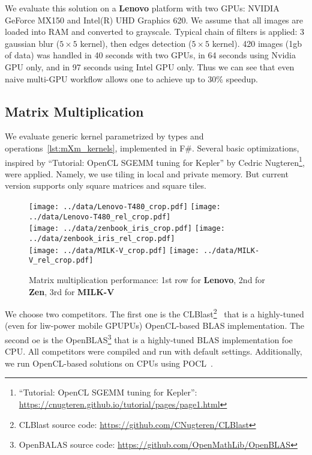 We evaluate this solution on a \textbf{Lenovo} platform with two GPUs: NVIDIA GeForce MX150 and Intel(R) UHD Graphics 620.
We assume that all images are loaded into RAM and converted to grayscale. 
Typical chain of filters is applied: 3 gaussian blur ($5 \times 5$ kernel), then edges detection ($5 \times 5$ kernel).
420 images (1gb of data) was handled in 40 seconds with two GPUs, in 64 seconds using Nvidia GPU only, and in 97 seconds using Intel GPU only.
Thus we can see that even naive multi-GPU workflow allows one to achieve up to 30\% speedup.

\subsection{Matrix Multiplication}

We evaluate generic kernel parametrized by types and operations~\ref{lst:mXm_kernels}, implemented in F\#.
Several basic optimizations, inspired by ``Tutorial: OpenCL SGEMM tuning for Kepler'' by Cedric Nugteren\footnote{``Tutorial: OpenCL SGEMM tuning for Kepler'': \url{https://cnugteren.github.io/tutorial/pages/page1.html}}, were applied.
Namely, we use tiling in local and private memory.
But current version supports only square matrices and square tiles.

\begin{figure}
  \begin{center}
  \texttt{[image: ../data/Lenovo-T480\_crop.pdf]}
  \texttt{[image: ../data/Lenovo-T480\_rel\_crop.pdf]}\\
  \texttt{[image: ../data/zenbook\_iris\_crop.pdf]}
  \texttt{[image: ../data/zenbook\_iris\_rel\_crop.pdf]}\\
  \texttt{[image: ../data/MILK-V\_crop.pdf]}
  \texttt{[image: ../data/MILK-V\_rel\_crop.pdf]}
  \end{center}
  \caption{Matrix multiplication performance: 1st row for \textbf{Lenovo}, 2nd for \textbf{Zen}, 3rd for \textbf{MILK-V}}
  \label{fig:mxm_perf}
\end{figure}

We choose two competitors.
The first one is the CLBlast\footnote{CLBlast source code: \url{https://github.com/CNugteren/CLBlast}}~\cite{10.1145/3204919.3204924} that is a highly-tuned (even for liw-power mobile GPUPUs) OpenCL-based BLAS implementation.
The second oe is the OpenBLAS\footnote{OpenBALAS source code: \url{https://github.com/OpenMathLib/OpenBLAS}} that is a highly-tuned BLAS implementation foe CPU.
All competitors were compiled and run with default settings.
Additionally, we run OpenCL-based solutions on CPUs using POCL~\cite{Jskelinen2014}.

